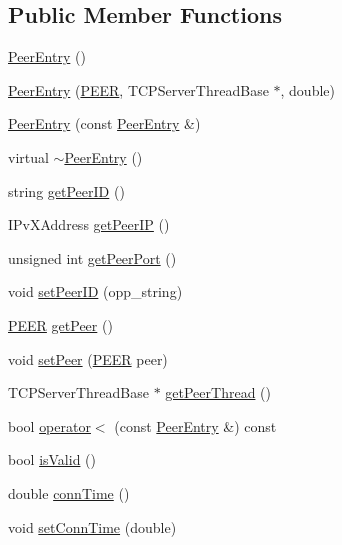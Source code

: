\subsection*{Public Member Functions}
\begin{DoxyCompactItemize}
\item 
\hyperlink{classPeerEntry_a4ee1f78b5c23cd7762cd399b5a5e8e58}{Peer\+Entry} ()
\item 
\hyperlink{classPeerEntry_a8a4776f60687e12738d39b99878a34b6}{Peer\+Entry} (\hyperlink{structPEER}{P\+E\+E\+R}, T\+C\+P\+Server\+Thread\+Base $\ast$, double)
\item 
\hyperlink{classPeerEntry_a6ac51e17ae2ca055ac80cffa93e9d074}{Peer\+Entry} (const \hyperlink{classPeerEntry}{Peer\+Entry} \&)
\item 
virtual \hyperlink{classPeerEntry_a4910d2784aea7a78d6a595e6d533af36}{$\sim$\+Peer\+Entry} ()
\item 
string \hyperlink{classPeerEntry_ad9d39bcf7ef8e4544b3a0ceee9e5b94f}{get\+Peer\+I\+D} ()
\item 
I\+Pv\+X\+Address \hyperlink{classPeerEntry_a387e85f61fe883e5020d415c35a0f79d}{get\+Peer\+I\+P} ()
\item 
unsigned int \hyperlink{classPeerEntry_a78b6e66766700afbf24b30abeacd7583}{get\+Peer\+Port} ()
\item 
void \hyperlink{classPeerEntry_a65594d3c04eded4743909e160db3e923}{set\+Peer\+I\+D} (opp\+\_\+string)
\item 
\hyperlink{structPEER}{P\+E\+E\+R} \hyperlink{classPeerEntry_a145089116f45cc2c8a06b7989a927c89}{get\+Peer} ()
\item 
void \hyperlink{classPeerEntry_a8a7932c0dcfdedf7b758d0794eea9015}{set\+Peer} (\hyperlink{structPEER}{P\+E\+E\+R} peer)
\item 
T\+C\+P\+Server\+Thread\+Base $\ast$ \hyperlink{classPeerEntry_a29fdb30de6469f154ae1fdb97bff9704}{get\+Peer\+Thread} ()
\item 
bool \hyperlink{classPeerEntry_ac1e496d1d68c52527fb192158dddc045}{operator$<$} (const \hyperlink{classPeerEntry}{Peer\+Entry} \&) const 
\item 
bool \hyperlink{classPeerEntry_ad71e7231029292b90b8100fc0604fb25}{is\+Valid} ()
\item 
double \hyperlink{classPeerEntry_a4c0f40b9bac8e4327b46f1b7f2c9d955}{conn\+Time} ()
\item 
void \hyperlink{classPeerEntry_a342f838cb5c7f4a1865a1cb6962c24fa}{set\+Conn\+Time} (double)
\end{DoxyCompactItemize}

